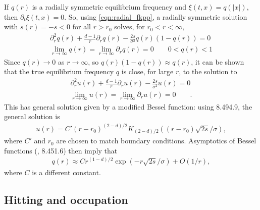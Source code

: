\documentclass{article}
\newcommand{\citet}[1]{\cite{#1}}
\begin{document}
If $q(r)$ is a radially symmetric equilibrium frequency and $\xi(t,x)=q(|x|)$,
then $\partial_t \xi(t,x) = 0$.
So, using \eqref{eqn:radial_fkpp}, a radially symmetric solution 
with $s(r) = -s < 0$ for all $r>r_0$ 
solves, for $r_0 < r < \infty$,
\begin{align} \label{eqn:radial_eqfreq_diffeq}
    \partial_r^2 q(r) + \frac{d-1}{r} \partial_r q(r) - \frac{2s}{\sigma^2} q(r) (1-q(r)) = 0 \\
    \lim_{r \to \infty} q(r) = \lim_{r \to \infty} \partial_r q(r) = 0 \qquad 
    0 < q(r) < 1 
\end{align}
Since $q(r) \to 0$ as $r \to \infty$, so $q(r) (1-q(r)) \approx q(r)$,
it can be shown 
that the true equilibrium frequency $q$ is close, for large $r$, to the solution to
\begin{align}
    \partial_r^2 u(r) + \frac{d-1}{r} \partial_r u(r) - \frac{2s}{\sigma^2} u(r) = 0  \label{eqn:bessel} \\
    \lim_{r \to \infty} u(r) = \lim_{r \to \infty} \partial_r u(r) = 0 \qquad  .
\end{align}
This has general solution given by a modified Bessel function:
using \citet{gradshteyn2007table} 8.494.9,
the general solution is
\begin{align}
    u(r) = C' (r-r_0)^{(2-d)/2} K_{(2-d)/2} \left( (r-r_0) \sqrt{2s}/\sigma \right) ,
\end{align}
where $C'$ and $r_0$ are chosen to match boundary conditions.
Asymptotics of Bessel functions (\citet{gradshteyn2007table}, 8.451.6) then imply that
\begin{align}
    q(r) \approx C r^{(1-d)/2} \exp \left( -r \sqrt{2s}/\sigma \right) + O(1/r),
\end{align}
where $C$ is a different constant.



\subsection[Hitting and Occupation]{Hitting and occupation}
\label{apx:hitting_occupation}
\end{document}
